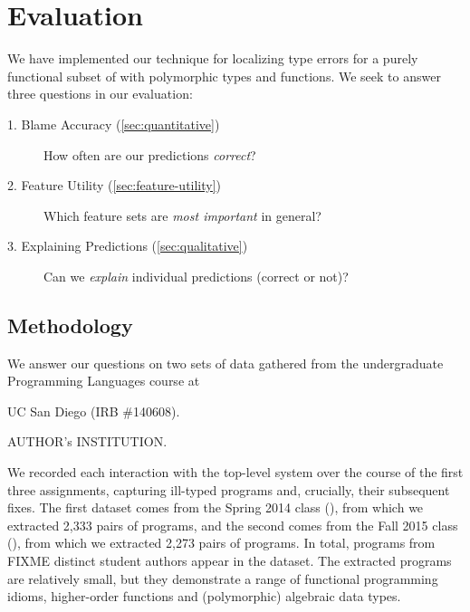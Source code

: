 \section{Evaluation}
\label{sec:evaluation}


We have implemented our technique for localizing type errors for a
purely functional subset of \ocaml with polymorphic types and functions.
%
We seek to answer three questions in our evaluation:
%
\begin{description}
\item[1. Blame Accuracy (\autoref{sec:quantitative})]
  How often are our predictions \emph{correct}?
\item[2. Feature Utility (\autoref{sec:feature-utility})]
  Which feature sets are \emph{most important} in general?
\item[3. Explaining Predictions (\autoref{sec:qualitative})]
  Can we \emph{explain} individual predictions (correct or not)?
\end{description}

\subsection{Methodology}
\label{sec:methodology}

We answer our questions on two sets of data gathered from the
undergraduate Programming Languages course at
\begin{anonsuppress}
UC San Diego (IRB \#140608).
\end{anonsuppress}
\begin{noanonsuppress}
AUTHOR's INSTITUTION.
\end{noanonsuppress}
%
We recorded each interaction with the \ocaml top-level system over the
course of the first three assignments, capturing
ill-typed programs and, crucially, their subsequent fixes.
%
The first dataset comes from the Spring 2014 class (\SPRING), from which
we extracted 2,333 pairs of programs, and the second comes from the Fall
2015 class (\FALL), from which we extracted 2,273 pairs of programs. In
total, programs from FIXME distinct student authors appear in the 
dataset.
%
The extracted programs are relatively small, but they demonstrate a
range of functional programming idioms, \eg higher-order functions and
(polymorphic) algebraic data types.

